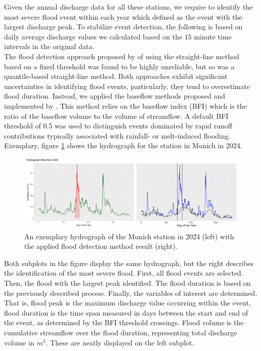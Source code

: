 \documentclass[
]{krantz}
\begin{document}
Given the annual discharge data for all these stations, we require to identify the
most severe flood event within each year which defined as the event with the largest discharge peak.
To stabilize event detection, the following is based on daily average discharge values we
calculated based on the \(15\) minute time intervals in the original data.\\
The flood detection approach proposed by \citet{grimaldi2006} of using the straight-line method based on a fixed threshold
was found to be highly unreliable, but so was a quantile-based straight-line method.
Both approaches exhibit significant uncertainties in identifying flood events,
particularly, they tend to overestimate flood duration.
Instead, we applied
the baseflow methods proposed and implemented by \citet{wasko2025}.
This method relies on the baseflow index (BFI) which is the ratio of the baseflow volume to the volume of streamflow.
A default BFI threshold of 0.5 was used to distinguish events dominated by rapid runoff contributions typically associated with rainfall- or melt-induced flooding.
Exemplary, figure \ref{fig:hydro} shows the hydrograph for the station in Munich in 2024.

\begin{figure}

{\centering \includegraphics[width=1\linewidth]{work/04-floodfreq/figures/data_hydrograph} 

}

\caption{An exemplary hydrograph of the Munich station in 2024 (left) with the applied flood detection method result (right).}\label{fig:hydro}
\end{figure}

Both subplots in the figure display the same hydrograph, but the right describes the identification of the most
severe flood. First, all flood events are selected. Then, the flood with the largest peak identified. The
flood duration is based on the previously described process.
Finally, the
variables of interest are determined. That is,
flood peak is the maximum discharge value occurring within the event,
flood duration is the time span measured in days between the start and end of the event, as determined by the BFI threshold crossings.
Flood volume is the cumulative streamflow over the flood duration, representing total discharge volume in \(m^3\).
These are neatly displayed on the left subplot.
\end{document}
